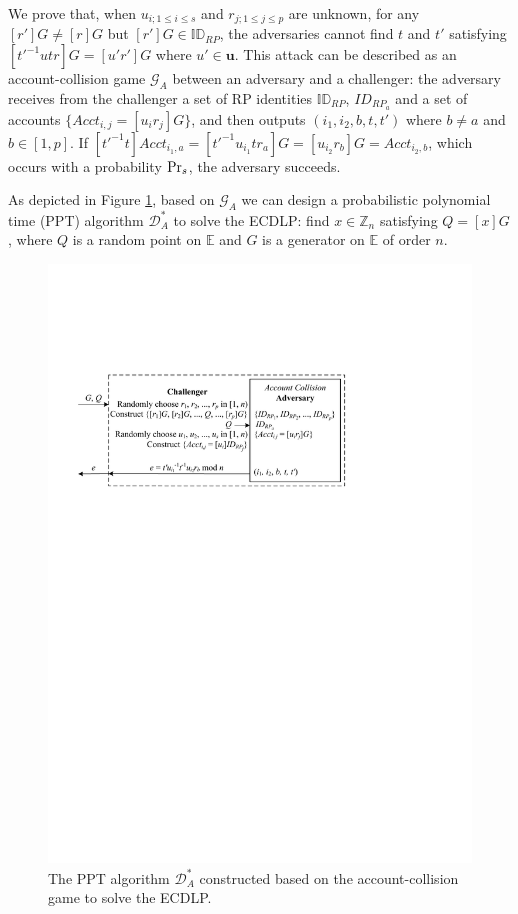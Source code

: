 We prove that, when $u_{i; 1\leq i \leq s}$ and $r_{j; 1\leq j \leq p}$ are unknown,
    for any $[r']G \neq [r]G$ but $[r']G \in \mathbb{ID}_{RP}$,
    the adversaries cannot find $t$ and $t'$ satisfying $[t'^{-1}utr]G = [u'r']G$ where $u' \in \mathbf{u}$.
This attack can be described as an account-collision game $\mathcal{G}_A$ between an adversary and a challenger:
 the adversary receives from the challenger a set of RP identities $\mathbb{ID}_{RP}$,
  $ID_{RP_{a}}$ and a set of accounts $\{Acct_{i,j}= [u_ir_j]G\}$,
 and then outputs $(i_1, i_2, b, t, t')$ where $b \neq a$ and $b \in [1,p]$.
If $[t'^{-1}t]Acct_{i_1,a} = [t'^{-1}u_{i_1}tr_{a}]G = [u_{i_2}r_{b}]G = Acct_{i_2,b}$, which occurs with a probability ${\rm Pr}_s$, the adversary succeeds.

As depicted in Figure \ref{fig:collision_account}, based on $\mathcal{G}_A$ we can design a probabilistic polynomial time (PPT) algorithm $\mathcal{D}^*_A$ to solve the ECDLP: find $x \in \mathbb{Z}_n$ satisfying $Q = [x]G$, where $Q$ is a random point on $\mathbb{E}$ and $G$ is a generator on $\mathbb{E}$ of order $n$.

\begin{figure}[tb]
  \centering
  \includegraphics[width=1.0\linewidth]{fig/ecdlp_algorithm2.pdf}
  \caption{The PPT algorithm $\mathcal{D}^*_A$ constructed based on the account-collision game to solve the ECDLP.}
  \label{fig:collision_account}
\end{figure}

